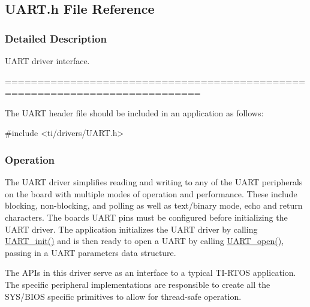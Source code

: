 \subsection{U\+A\+R\+T.\+h File Reference}
\label{_u_a_r_t_8h}


\subsubsection{Detailed Description}
U\+A\+R\+T driver interface. 

============================================================================

The U\+A\+R\+T header file should be included in an application as follows\+: 
\begin{DoxyCode}
\textcolor{preprocessor}{#include <ti/drivers/UART.h>}
\end{DoxyCode}


\subsubsection*{Operation}

The U\+A\+R\+T driver simplifies reading and writing to any of the U\+A\+R\+T peripherals on the board with multiple modes of operation and performance. These include blocking, non-\/blocking, and polling as well as text/binary mode, echo and return characters. The board\textquotesingle{}s U\+A\+R\+T pins must be configured before initializing the U\+A\+R\+T driver. The application initializes the U\+A\+R\+T driver by calling \hyperlink{_u_a_r_t_8h_ab60a36f7295d704926120d22f806dcd1}{U\+A\+R\+T\+\_\+init()} and is then ready to open a U\+A\+R\+T by calling \hyperlink{_u_a_r_t_8h_a0442ea1ec23901168da31726bb3254c1}{U\+A\+R\+T\+\_\+open()}, passing in a U\+A\+R\+T parameters data structure.

The A\+P\+Is in this driver serve as an interface to a typical T\+I-\/\+R\+T\+O\+S application. The specific peripheral implementations are responsible to create all the S\+Y\+S/\+B\+I\+O\+S specific primitives to allow for thread-\/safe operation.

